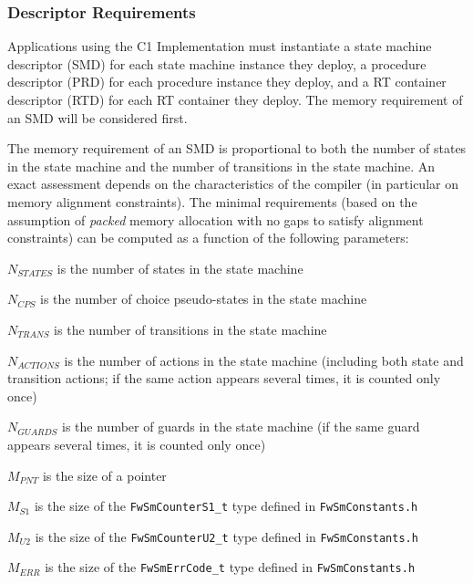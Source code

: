 \documentclass[a4paper,10pt]{article}
\newenvironment{fw_itemize}						%
{\begin{itemize}
  \setlength{\itemsep}{1mm}
  \setlength{\parskip}{0pt}
  \setlength{\parsep}{0pt}}
{\end{itemize}}
\begin{document}
\subsubsection{Descriptor Requirements}
Applications using the C1 Implementation must instantiate a state machine descriptor (SMD) for each state machine 
instance they deploy, a procedure descriptor (PRD) for each procedure instance they deploy, and a RT container descriptor (RTD) for each RT container they deploy. 
The memory requirement of an SMD will be considered first.

The memory requirement of an SMD is proportional to both the number of states in the state machine and the number 
of transitions in the state machine. An exact assessment depends on the characteristics of the compiler 
(in particular on memory alignment constraints). The minimal requirements (based on the assumption of \emph{packed} 
memory allocation with no gaps to satisfy alignment constraints) can be computed as a function of the following 
parameters:

\begin{fw_itemize}
\item {$N_{STATES}$} is the number of states in the state machine
\item {$N_{CPS}$} is the number of choice pseudo-states in the state machine
\item {$N_{TRANS}$} is the number of transitions in the state machine
\item {$N_{ACTIONS}$} is the number of actions in the state machine (including both state and transition actions; 
if the same action appears several times, it is counted only once)
\item {$N_{GUARDS}$} is the number of guards in the state machine (if the same guard appears several times, it is counted 
only once)
\item {$M_{PNT}$} is the size of a pointer 
\item {$M_{S1}$} is the size of the \texttt{FwSmCounterS1\_t} type defined in \texttt{FwSmConstants.h} 
\item {$M_{U2}$} is the size of the \texttt{FwSmCounterU2\_t} type defined in \texttt{FwSmConstants.h} 
\item {$M_{ERR}$} is the size of the \texttt{FwSmErrCode\_t} type defined in \texttt{FwSmConstants.h} 
\end{fw_itemize}
\end{document}
